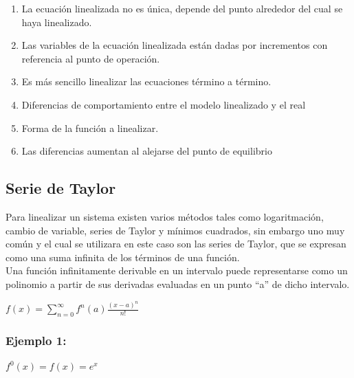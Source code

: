 \documentclass[a4paper,12pt,twoside]{proyectotanquesecci}
\begin{document}
\begin{enumerate}
\item La ecuación linealizada no es única, depende del punto alrededor del cual se haya linealizado.
\item Las variables de la ecuación linealizada están dadas por incrementos con referencia al punto de operación.
\item Es más sencillo linealizar las ecuaciones término a término.
\item Diferencias de comportamiento entre el modelo linealizado y el real
\item Forma de la función a linealizar.
\item Las diferencias aumentan al alejarse del punto de equilibrio 
\end{enumerate}

\subsection{Serie de Taylor}

Para linealizar un sistema existen varios métodos tales como logaritmación, cambio de variable, series de Taylor y mínimos cuadrados, sin embargo uno muy común y el cual se utilizara en este caso son las series de Taylor, que se expresan como una suma infinita de los términos de una función.\\

Una función infinitamente derivable en un intervalo puede representarse como un polinomio a partir de sus derivadas evaluadas en un punto “a” de dicho intervalo.

\begin{center}
	$f\left( x\right) =\sum ^{\infty }_{n=0}f^{n}\left( a\right) \frac {\left( x-a\right) ^{n}}{n!}$
\end{center}

\subsubsection{Ejemplo 1:}

\begin{center}
	$f^{0}\left( x\right) =f\left( x\right) =e^{x}$
\end{center}
\end{document}
